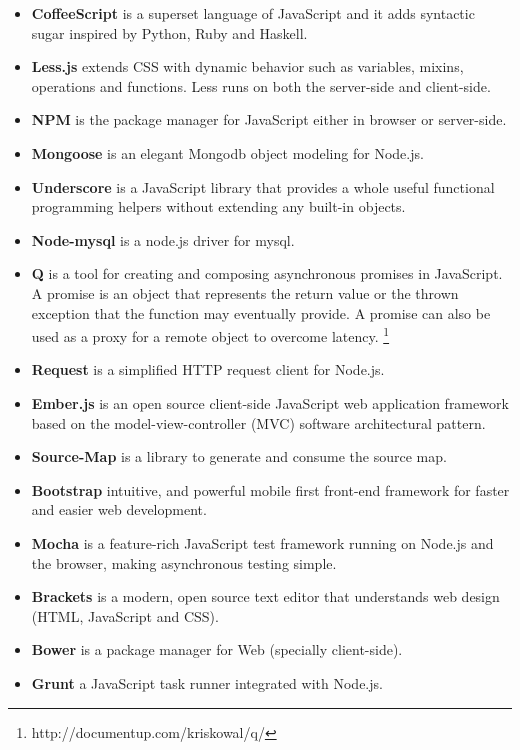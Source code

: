 \begin{itemize}
	\item \textbf{CoffeeScript} is a superset language of JavaScript and it adds syntactic sugar inspired by Python, Ruby and Haskell.
	\item \textbf{Less.js} extends CSS with dynamic behavior such as variables, mixins, operations and functions. Less runs on both the server-side and client-side.
	\item \textbf{NPM} is the package manager for JavaScript either in browser or server-side.
	\item \textbf{Mongoose} is an elegant Mongodb object modeling for Node.js.
	\item \textbf{Underscore} is a JavaScript library that provides a whole useful functional programming helpers without extending any built-in objects.
	\item \textbf{Node-mysql} is a node.js driver for mysql.
	\item \textbf{Q} is a tool for creating and composing asynchronous promises in JavaScript. A promise is an object that represents the return value or the thrown exception that the function may eventually provide. A promise can also be used as a proxy for a remote object to overcome latency. \footnote{http://documentup.com/kriskowal/q/}
	\item \textbf{Request} is a simplified HTTP request client for Node.js.
	\item \textbf{Ember.js} is an open source client-side JavaScript web application framework based on the model-view-controller (MVC) software architectural pattern.
	\item \textbf{Source-Map} is a library to generate and consume the source map.
	\item \textbf{Bootstrap} intuitive, and powerful mobile first front-end framework for faster and easier web development.
	\item \textbf{Mocha} is a feature-rich JavaScript test framework running on Node.js and the browser, making asynchronous testing simple.
	\item \textbf{Brackets} is a modern, open source text editor that understands web design (HTML, JavaScript and CSS).
	\item \textbf{Bower} is a package manager for Web (specially client-side).
	\item \textbf{Grunt} a JavaScript task runner integrated with Node.js.	
\end{itemize} 

